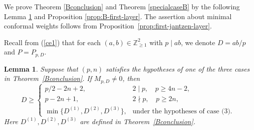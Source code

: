 \documentclass[11pt,a4paper]{amsart}
\newcommand{\ZZ}{\mathbb Z}
\theoremstyle{plain}
\newtheorem{lem}[theorem]{Lemma}
\numberwithin{equation}{section}
\begin{document}
We prove Theorem \ref{Bconclusion} and Theorem  \ref{specialcaseB} by the following  Lemma \ref{lem:B-endpoint} and Proposition \ref{prop:B-first-layer}.  The assertion about minimal conformal weights follows from Proposition~\ref{prop:first-jantzen-layer}.

 Recall from (\ref{ce1}) that for each \((a,b)\in\ZZ_{\ge1}^2\) with \(p\mid ab\), we denote
\(D=ab/p\) and \(P=P_{p,D}\). 
\begin{lem}\label{lem:B-endpoint} 
	Suppose that \((p,n)\) satisfies the hypotheses of one of the
	three cases in Theorem~\ref{Bconclusion}. If \(M_{p,D}\ne0\), then
	\[
	D\ge
	\begin{cases}
		p/2-2n+2,&2\mid p,\quad p\ge4n-2,\\
		p-2n+1,&2\nmid p,\quad p\ge2n,\\
		\min\{D^{(1)},D^{(2)},D^{(3)}\},&\text{under the hypotheses of case~(3).}
	\end{cases}
	\]
	Here \(D^{(1)},D^{(2)},D^{(3)}\) are defined in
	Theorem~\ref{Bconclusion}.
\end{lem}
\end{document}
